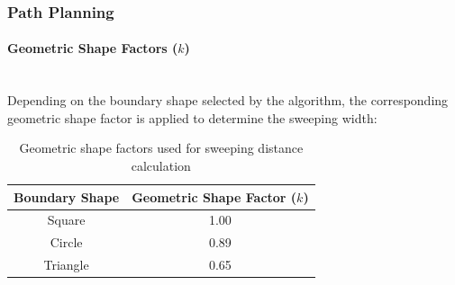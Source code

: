 \documentclass[12pt, a4paper]{article}
\begin{document}
\subsubsection*{Path Planning}

\paragraph{Geometric Shape Factors ($k$)} ~\\
Depending on the boundary shape selected by the algorithm, the corresponding
geometric shape factor is applied to determine the sweeping width:

\begin{table}[H]
    \centering
    \caption{Geometric shape factors used for sweeping distance calculation}
    \label{tab:shape_factors}
    \begin{tabular}{|c|c|}
        \hline
        \textbf{Boundary Shape} & \textbf{Geometric Shape Factor ($k$)} \\
        \hline
        Square   & 1.00 \\
        \hline
        Circle   & 0.89 \\
        \hline
        Triangle & 0.65 \\
        \hline
    \end{tabular}
\end{table}

\newpage
{}

 
\end{document}
